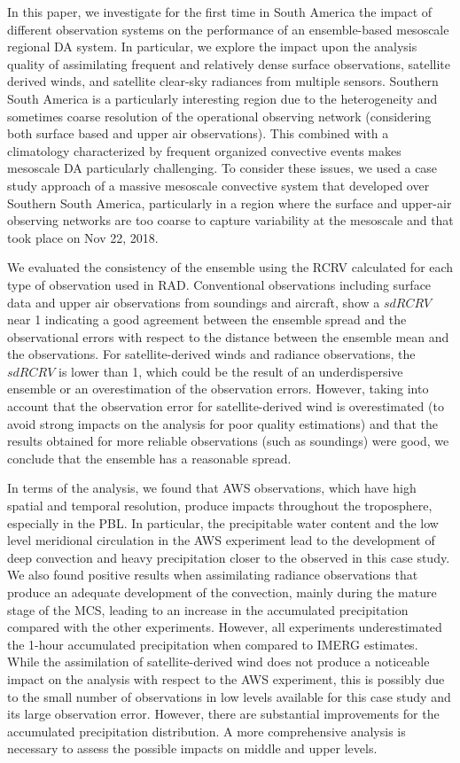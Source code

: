 \documentclass[final,5p,times,twocolumn,authoryear]{elsarticle} %
\begin{document}
In this paper, we investigate for the first time in South America the impact of different observation systems on the performance of an ensemble-based mesoscale regional DA system. In particular, we explore the impact upon the analysis quality of assimilating frequent and relatively dense surface observations, satellite derived winds, and satellite clear-sky radiances from multiple sensors. Southern South America is a particularly interesting region due to the heterogeneity and sometimes coarse resolution of the operational observing network (considering both surface based and upper air observations). This combined with a climatology characterized by frequent organized convective events makes mesoscale DA particularly challenging. To consider these issues, we used a case study approach of a massive mesoscale convective system that developed over Southern South America, particularly in a region where the surface and upper-air observing networks are too coarse to capture variability at the mesoscale and that took place on Nov 22, 2018.

We evaluated the consistency of the ensemble using the RCRV calculated for each type of observation used in RAD. Conventional observations including surface data and upper air observations from soundings and aircraft, show a \(sd RCRV\) near 1 indicating a good agreement between the ensemble spread and the observational errors with respect to the distance between the ensemble mean and the observations. For satellite-derived winds and radiance observations, the \(sd RCRV\) is lower than 1, which could be the result of an underdispersive ensemble or an overestimation of the observation errors. However, taking into account that the observation error for satellite-derived wind is overestimated (to avoid strong impacts on the analysis for poor quality estimations) and that the results obtained for more reliable observations (such as soundings) were good, we conclude that the ensemble has a reasonable spread.

In terms of the analysis, we found that AWS observations, which have high spatial and temporal resolution, produce impacts throughout the troposphere, especially in the PBL. In particular, the precipitable water content and the low level meridional circulation in the AWS experiment lead to the development of deep convection and heavy precipitation closer to the observed in this case study. We also found positive results when assimilating radiance observations that produce an adequate development of the convection, mainly during the mature stage of the MCS, leading to an increase in the accumulated precipitation compared with the other experiments. However, all experiments underestimated the 1-hour accumulated precipitation when compared to IMERG estimates. While the assimilation of satellite-derived wind does not produce a noticeable impact on the analysis with respect to the AWS experiment, this is possibly due to the small number of observations in low levels available for this case study and its large observation error. However, there are substantial improvements for the accumulated precipitation distribution. A more comprehensive analysis is necessary to assess the possible impacts on middle and upper levels.
\end{document}
